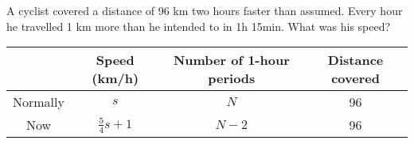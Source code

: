 
%
%
%
%
% 
% 

\question A cyclist covered a distance of 96 km two hours faster than assumed. Every hour
he travelled 1 km more than he intended to in 1h 15min. What was his speed?

\insertQR{}

\ifprintanswers
  \begin{table}
  	\begin{tabular}{cccc}
  	    \toprule
  		& Speed (km/h) & Number of 1-hour periods & Distance covered \\
  		\midrule
  		Normally & $s$ & $N$ & 96 \\
  		Now & $\frac{5}{4}s + 1$ & $N-2$ & 96 \\
  		\bottomrule
  	
  	\end{tabular}
  \end{table}
\fi 


